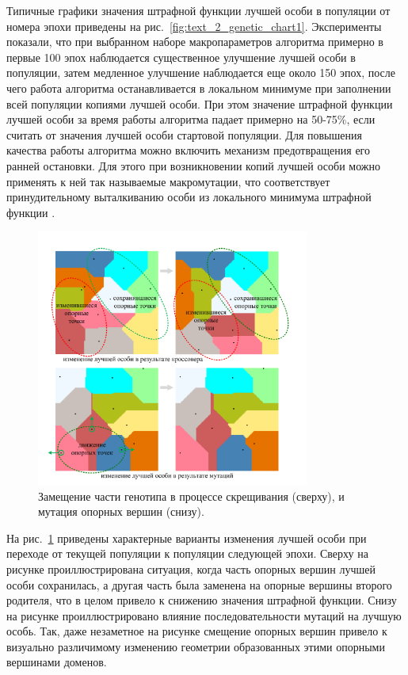 Типичные графики значения штрафной функции лучшей особи в популяции от номера эпохи приведены на рис.~\ref{fig:text_2_genetic_chart1}.
Эксперименты показали, что при выбранном наборе макропараметров алгоритма примерно в первые 100 эпох наблюдается существенное улучшение лучшей особи в популяции, затем медленное улучшение наблюдается еще около 150 эпох, после чего работа алгоритма останавливается в локальном минимуме при заполнении всей популяции копиями лучшей особи.
При этом значение штрафной функции лучшей особи за время работы алгоритма падает примерно на 50-75\%, если считать от значения лучшей особи стартовой популяции.
Для повышения качества работы алгоритма можно включить механизм предотвращения его ранней остановки.
Для этого при возникновении копий лучшей особи можно применять к ней так называемые макромутации, что соответствует принудительному выталкиванию особи из локального минимума штрафной функции \cite{Baranov2025Gen}.

\begin{figure}[ht]
\centering
\includegraphics[width=0.8\textwidth]{./pics/text_2_genetic/changes.pdf}
\singlespacing
{}\caption{Замещение части генотипа\label{term:genotype2} в процессе скрещивания (сверху), и мутация опорных вершин\label{term:opor_point2} (снизу).}
\label{fig:text_2_genetic_changes}
\end{figure}

На рис.~\ref{fig:text_2_genetic_changes} приведены характерные варианты изменения лучшей особи при переходе от текущей популяции к популяции следующей эпохи.
Сверху на рисунке проиллюстрирована ситуация, когда часть опорных вершин лучшей особи сохранилась, а другая часть была заменена на опорные вершины второго родителя, что в целом привело к снижению значения штрафной функции.
Снизу на рисунке проиллюстрировано влияние последовательности мутаций на лучшую особь.
Так, даже незаметное на рисунке смещение опорных вершин привело к визуально различимому изменению геометрии образованных этими опорными вершинами доменов.


